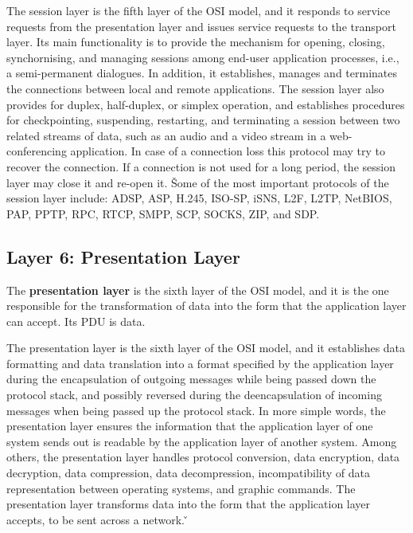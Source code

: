 The session layer is the fifth layer of the OSI model, and it responds to service requests from the presentation
layer and issues service requests to the transport layer. Its main functionality is to provide the mechanism for
opening, closing, synchornising, and managing sessions among end-user application processes, i.e., a semi-permanent
dialogues. In addition, it establishes, manages and terminates the connections between local and remote applications.
The session layer also provides for duplex, half-duplex, or simplex operation, and establishes procedures for
checkpointing, suspending, restarting, and terminating a session between two related streams of data, such as an audio
and a video stream in a web-conferencing application. In case of a connection loss this protocol may try to recover the
connection. If a connection is not used for a long period, the session layer may close it and re-open it. \v

Some of the most important protocols of the session layer include: ADSP, ASP, H.245, ISO-SP, iSNS, L2F, L2TP, NetBIOS,
PAP, PPTP, RPC, RTCP, SMPP, SCP, SOCKS, ZIP, and SDP\@.

\subsection{Layer 6: Presentation Layer}

The \textbf{presentation layer} is the sixth layer of the OSI model, and it is the one responsible for the
transformation of data into the form that the application layer can accept. Its PDU is data.
\ed

The presentation layer is the sixth layer of the OSI model, and it establishes data formatting and data translation
into a format specified by the application layer during the encapsulation of outgoing messages while being passed
down the protocol stack, and possibly reversed during the deencapsulation of incoming messages when being passed up
the protocol stack. In more simple words, the presentation layer ensures the information that the application layer
of one system sends out is readable by the application layer of another system. Among others, the presentation layer
handles protocol conversion, data encryption, data decryption, data compression, data decompression, incompatibility
of data representation between operating systems, and graphic commands. The presentation layer transforms data into
the form that the application layer accepts, to be sent across a network. \v

